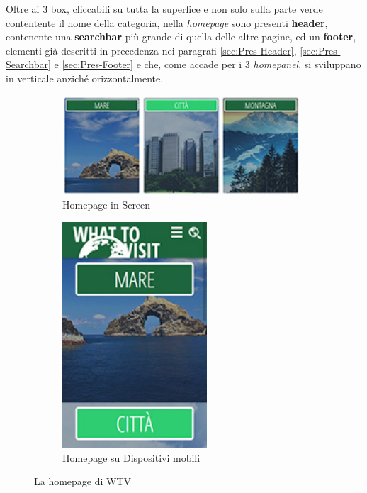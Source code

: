 Oltre ai 3 box, cliccabili su tutta la superfice e non solo sulla parte verde
contentente il nome della categoria, nella \textit{homepage} sono presenti
\textbf{header}, contenente una \textbf{searchbar} più grande di quella delle
altre pagine, ed un \textbf{footer}, elementi già descritti in precedenza nei
paragrafi \ref{sec:Pres-Header}, \ref{sec:Pres-Searchbar} e
\ref{sec:Pres-Footer} e che, come accade per i 3 \textit{homepanel}, si
sviluppano in verticale anziché orizzontalmente.
\begin{figure}[h!]
        \centering
        \begin{subfigure}[b]{0.3\textwidth}
                \includegraphics[height=3.7cm,width=8.9cm]{images/pres_home.jpg}
                \caption{Homepage in Screen}
                \label{fig:Home-screen}
        \end{subfigure}
        \hspace{5cm}
        \begin{subfigure}[b]{0.3\textwidth}
                \includegraphics[height=8.43cm,width=5.4cm]{images/pres_home_m.jpg}
                \caption{Homepage su Dispositivi mobili}
                \label{fig:Home-mobile}
        \end{subfigure}
        \caption{La homepage di WTV}\label{fig:Display-Home}
\end{figure}

